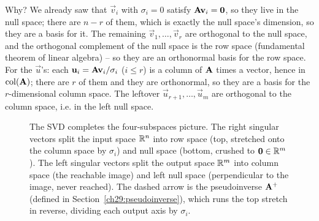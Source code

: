 Why? We already saw that $\vec{v}_i$ with $\sigma_i = 0$ satisfy $\mathbf{A}\mathbf{v}_i
= \mathbf{0}$, so they live in the null space; there are $n - r$ of them, which is
exactly the null space's dimension, so they are a basis for it. The remaining
$\vec{v}_1,\dots,\vec{v}_r$ are orthogonal to the null space, and the orthogonal
complement of the null space is the row space (fundamental theorem of linear
algebra) -- so they are an orthonormal basis for the row space. For the
$\vec{u}$'s: each $\mathbf{u}_i = \mathbf{A}\mathbf{v}_i/\sigma_i$ ($i\le r$) is a column of
$\mathbf{A}$ times a vector, hence in $\operatorname{col}(\mathbf{A})$; there are $r$ of them and they
are orthonormal, so they are a basis for the $r$-dimensional column space. The
leftover $\vec{u}_{r+1},\dots,\vec{u}_m$ are orthogonal to the column space, i.e.
in the left null space.

\begin{figure}[H]
\centering
{}
\caption{The SVD completes the four-subspaces picture. The right singular vectors
split the input space $\mathbb{R}^n$ into row space (top, stretched onto the column space
by $\sigma_i$) and null space (bottom, crushed to $\mathbf{0}\in\mathbb{R}^m$). The left singular vectors
split the output space $\mathbb{R}^m$ into column space (the reachable image) and left null space
(perpendicular to the image, never reached). The dashed arrow is the pseudoinverse
$\mathbf{A}^+$ (defined in Section~\ref{ch29:pseudoinverse}), which runs the top
stretch in reverse, dividing each output axis by $\sigma_i$.}
\label{ch29:fig-four-subspaces}
\end{figure}

